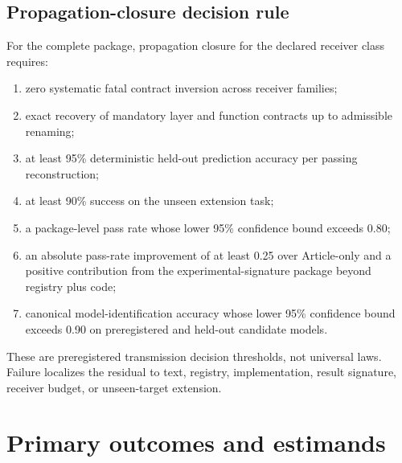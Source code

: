\documentclass[11pt]{article}
\begin{document}
\subsection{Propagation-closure decision rule}

For the complete package, propagation closure for the declared receiver class requires:
\begin{enumerate}
\item zero systematic fatal contract inversion across receiver families;
\item exact recovery of mandatory layer and function contracts up to admissible renaming;
\item at least 95\% deterministic held-out prediction accuracy per passing reconstruction;
\item at least 90\% success on the unseen extension task;
\item a package-level pass rate whose lower 95\% confidence bound exceeds 0.80;
\item an absolute pass-rate improvement of at least 0.25 over Article-only and a positive contribution from the experimental-signature package beyond registry plus code;
\item canonical model-identification accuracy whose lower 95\% confidence bound exceeds 0.90 on preregistered and held-out candidate models.
\end{enumerate}
These are preregistered transmission decision thresholds, not universal laws. Failure localizes the residual to text, registry, implementation, result signature, receiver budget, or unseen-target extension.

\section{Primary outcomes and estimands}
\end{document}
